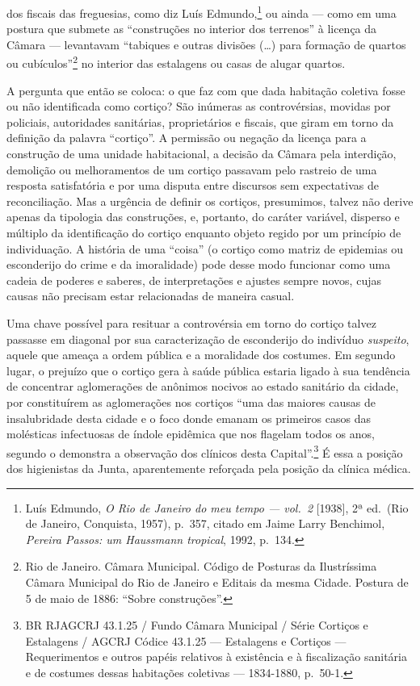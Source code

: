 dos fiscais das freguesias, como diz Luís Edmundo,\footnote{Luís
  Edmundo, \textit{O Rio de Janeiro do meu tempo --- vol.~2} {[}1938{]}, 2ª
  ed.~(Rio de Janeiro, Conquista, 1957), p.~357, citado em Jaime Larry
  Benchimol, \textit{Pereira Passos: um Haussmann tropical}, 1992, p.~134.}
ou ainda --- como em uma postura que submete as ``construções no interior
dos terrenos'' à licença da Câmara --- levantavam ``tabiques e outras
divisões (\ldots{}) para formação de quartos ou cubículos''\footnote{Rio
  de Janeiro. Câmara Municipal. Código de Posturas da Ilustríssima
  Câmara Municipal do Rio de Janeiro e Editais da mesma Cidade. Postura
  de 5 de maio de 1886: ``Sobre construções''.} no interior das
estalagens ou casas de alugar quartos.

A pergunta que então se coloca: o que faz com que dada habitação
coletiva fosse ou não identificada como cortiço? São inúmeras as
controvérsias, movidas por policiais, autoridades sanitárias,
proprietários e fiscais, que giram em torno da definição da palavra
``cortiço''. A permissão ou negação da licença para a construção de uma
unidade habitacional, a decisão da Câmara pela interdição, demolição ou
melhoramentos de um cortiço passavam pelo rastreio de uma resposta
satisfatória e por uma disputa entre discursos sem expectativas de
reconciliação. Mas a urgência de definir os cortiços, presumimos, talvez
não derive apenas da tipologia das construções, e, portanto, do caráter
variável, disperso e múltiplo da identificação do cortiço enquanto
objeto regido por um princípio de individuação. A história de uma
``coisa'' (o cortiço como matriz de epidemias ou esconderijo do crime e
da imoralidade) pode desse modo funcionar como uma cadeia de poderes e
saberes, de interpretações e ajustes sempre novos, cujas causas não
precisam estar relacionadas de maneira casual.

Uma chave possível para resituar a controvérsia em torno do cortiço
talvez passasse em diagonal por sua caracterização de esconderijo do
indivíduo \textit{suspeito}, aquele que ameaça a ordem pública e a
moralidade dos costumes. Em segundo lugar, o prejuízo que o cortiço gera
à saúde pública estaria ligado à sua tendência de concentrar
aglomerações de anônimos nocivos ao estado sanitário da cidade, por
constituírem as aglomerações nos cortiços ``uma das maiores causas de
insalubridade desta cidade e o foco donde emanam os primeiros casos das
molésticas infectuosas de índole epidêmica que nos flagelam todos os
anos, segundo o demonstra a observação dos clínicos desta
Capital''.\footnote{BR RJAGCRJ 43.1.25 / Fundo Câmara Municipal / Série
  Cortiços e Estalagens / AGCRJ Códice 43.1.25 --- Estalagens e Cortiços
  --- Requerimentos e outros papéis relativos à existência e à
  fiscalização sanitária e de costumes dessas habitações coletivas ---
  1834-1880, p.~50-1.} É essa a posição dos higienistas da Junta,
aparentemente reforçada pela posição da clínica médica.

